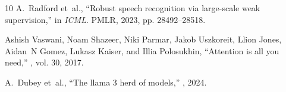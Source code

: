 \documentclass{article}
\def\L{{\cal L}}
\begin{document}
\begin{thebibliography}{10}
A.~Radford et~al.,
\newblock ``Robust speech recognition via large-scale weak supervision,''
\newblock in {\em ICML}. PMLR, 2023, pp. 28492--28518.

Ashish Vaswani, Noam Shazeer, Niki Parmar, Jakob Uszkoreit, Llion Jones,
  Aidan~N Gomez, {\L}ukasz Kaiser, and Illia Polosukhin,
\newblock ``Attention is all you need,''
, vol. 30,
  2017.

A.~Dubey et~al.,
\newblock ``The llama 3 herd of models,''
, 2024.

\end{thebibliography}
 
\end{document}
